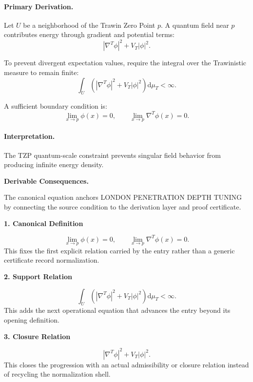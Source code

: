\paragraph{Primary Derivation.}
Let $U$ be a neighborhood of the Trawin Zero Point $p$.  
A quantum field near $p$ contributes energy through gradient and potential terms:
\begin{equation}
|\nabla^T\phi|^2
+
V_T|\phi|^2 .
\end{equation}

To prevent divergent expectation values, require the integral over the Trawinistic measure to remain finite:
\begin{equation}
\int_U
\left(
|\nabla^T\phi|^2
+
V_T|\phi|^2
\right)
\mathrm{d}\mu_T
<\infty .
\end{equation}

A sufficient boundary condition is:
\begin{equation}
\boxed{
\lim_{x\to p}\phi(x)=0,
\qquad
\lim_{x\to p}\nabla^T\phi(x)=0 .
}
\end{equation}

\paragraph{Interpretation.}
The TZP quantum-scale constraint prevents singular field behavior from producing infinite energy density.

\par\vspace{0.35em}
\noindent\textbf{Derivable Consequences.}\quad
\begingroup
\footnotesize
\raggedright
The canonical equation anchors LONDON PENETRATION DEPTH TUNING by connecting the source condition to the derivation layer and proof certificate.
\par\endgroup

\noindent\textbf{1. Canonical Definition}\par
\[
\lim_{x\to p}\phi(x)=0, \qquad \lim_{x\to p}\nabla^T\phi(x)=0.
\]
\noindent This fixes the first explicit relation carried by the entry rather than a generic certificate record normalization.\par
\noindent\textbf{2. Support Relation}\par
\[
\int_U \left( |\nabla^T\phi|^2 + V_T|\phi|^2 \right) \mathrm{d}\mu_T <\infty.
\]
\noindent This adds the next operational equation that advances the entry beyond its opening definition.\par
\noindent\textbf{3. Closure Relation}\par
\[
|\nabla^T\phi|^2 + V_T|\phi|^2.
\]
\noindent This closes the progression with an actual admissibility or closure relation instead of recycling the normalization shell.\par

